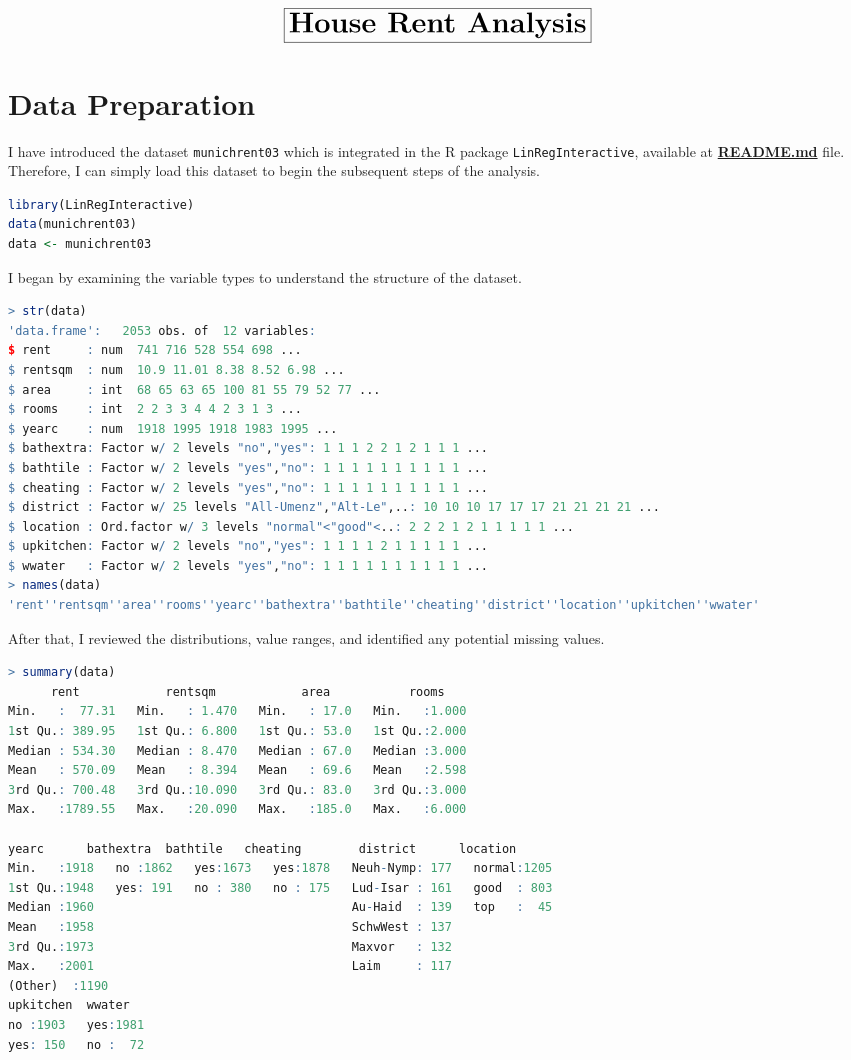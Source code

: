 \documentclass[15pt,a4paper]{report}
\begin{document}
\[
	\boxed{\huge \textbf{House Rent Analysis}}
\]
\section*{Data Preparation}
I have introduced the dataset \lstinline[language=R]|munichrent03| which is integrated in the R package \lstinline[language=R]|LinRegInteractive|, available at \textbf{\href{https://github.com/taitran0102/rent-analysis/blob/main/README.md}{README.md}} file. Therefore, I can simply load this dataset to begin the subsequent steps of the analysis.
\begin{lstlisting}[language=R]
library(LinRegInteractive)
data(munichrent03)
data <- munichrent03 
\end{lstlisting}
I began by examining the variable types to understand the structure of the dataset. 
\begin{lstlisting}[language=R]
> str(data)
'data.frame':	2053 obs. of  12 variables:
$ rent     : num  741 716 528 554 698 ...
$ rentsqm  : num  10.9 11.01 8.38 8.52 6.98 ...
$ area     : int  68 65 63 65 100 81 55 79 52 77 ...
$ rooms    : int  2 2 3 3 4 4 2 3 1 3 ...
$ yearc    : num  1918 1995 1918 1983 1995 ...
$ bathextra: Factor w/ 2 levels "no","yes": 1 1 1 2 2 1 2 1 1 1 ...
$ bathtile : Factor w/ 2 levels "yes","no": 1 1 1 1 1 1 1 1 1 1 ...
$ cheating : Factor w/ 2 levels "yes","no": 1 1 1 1 1 1 1 1 1 1 ...
$ district : Factor w/ 25 levels "All-Umenz","Alt-Le",..: 10 10 10 17 17 17 21 21 21 21 ...
$ location : Ord.factor w/ 3 levels "normal"<"good"<..: 2 2 2 1 2 1 1 1 1 1 ...
$ upkitchen: Factor w/ 2 levels "no","yes": 1 1 1 1 2 1 1 1 1 1 ...
$ wwater   : Factor w/ 2 levels "yes","no": 1 1 1 1 1 1 1 1 1 1 ...
> names(data)
'rent''rentsqm''area''rooms''yearc''bathextra''bathtile''cheating''district''location''upkitchen''wwater'
\end{lstlisting}
After that, I reviewed the distributions, value ranges, and identified any potential missing values.
\begin{lstlisting}[language=R]
> summary(data)
      rent            rentsqm            area           rooms      
Min.   :  77.31   Min.   : 1.470   Min.   : 17.0   Min.   :1.000  
1st Qu.: 389.95   1st Qu.: 6.800   1st Qu.: 53.0   1st Qu.:2.000  
Median : 534.30   Median : 8.470   Median : 67.0   Median :3.000  
Mean   : 570.09   Mean   : 8.394   Mean   : 69.6   Mean   :2.598  
3rd Qu.: 700.48   3rd Qu.:10.090   3rd Qu.: 83.0   3rd Qu.:3.000  
Max.   :1789.55   Max.   :20.090   Max.   :185.0   Max.   :6.000  

yearc      bathextra  bathtile   cheating        district      location   
Min.   :1918   no :1862   yes:1673   yes:1878   Neuh-Nymp: 177   normal:1205  
1st Qu.:1948   yes: 191   no : 380   no : 175   Lud-Isar : 161   good  : 803  
Median :1960                                    Au-Haid  : 139   top   :  45  
Mean   :1958                                    SchwWest : 137                
3rd Qu.:1973                                    Maxvor   : 132                
Max.   :2001                                    Laim     : 117                
(Other)  :1190                
upkitchen  wwater    
no :1903   yes:1981  
yes: 150   no :  72  

\end{lstlisting}
\end{document}
